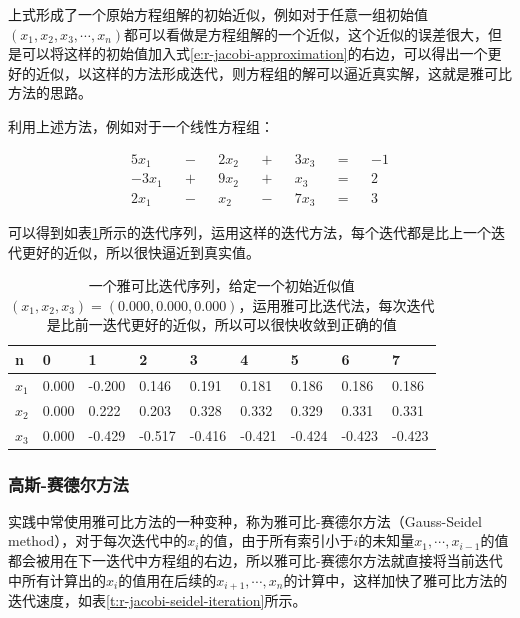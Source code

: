 上式形成了一个原始方程组解的初始近似，例如对于任意一组初始值$(x_1,x_2,x_3,\cdots,x_n)$都可以看做是方程组解的一个近似，这个近似的误差很大，但是可以将这样的初始值加入式\ref{e:r-jacobi-approximation}的右边，可以得出一个更好的近似，以这样的方法形成迭代，则方程组的解可以逼近真实解，这就是雅可比方法的思路。

利用上述方法，例如对于一个线性方程组：

\begin{equation}
\begin{aligned}
	5x_1  && - && 2x_2 && + && 3x_3 && = && -1\\
	-3x_1 && + && 9x_2 && + && x_3  && = && 2\\
	2x_1  && - && x_2  && - && 7x_3 && = && 3
\end{aligned}
\end{equation}

可以得到如表\ref{t:r-jacobi-iteration}所示的迭代序列，运用这样的迭代方法，每个迭代都是比上一个迭代更好的近似，所以很快逼近到真实值。

\begin{table}
\caption{一个雅可比迭代序列，给定一个初始近似值$(x_1,x_2,x_3)=(0.000,0.000,0.000)$，运用雅可比迭代法，每次迭代是比前一迭代更好的近似，所以可以很快收敛到正确的值}
\label{t:r-jacobi-iteration}
\begin{tabular}{p{}|p{}|p{}|p{}|p{}|p{}|p{}|p{}|p{}}
\hline 
   n & 0 & 1 & 2 & 3& 4& 5 &6 & 7 \\
    \hline  
  $x_1$ & 0.000 & -0.200 & 0.146  & 0.191  & 0.181  & 0.186  & 0.186  & 0.186\\
  $x_2$ & 0.000 & 0.222  & 0.203  & 0.328  & 0.332  & 0.329  & 0.331  & 0.331\\
  $x_3$ & 0.000 & -0.429 & -0.517 & -0.416 & -0.421 & -0.424 & -0.423 & -0.423\\
 \hline 
\end{tabular}
\end{table}




\subsubsection{高斯-赛德尔方法}\label{sec:r-gauss-seidel-iteration}
实践中常使用雅可比方法的一种变种\cite{a:ModelingtheInteractionofLightBetweenDiffuseSurfaces}，称为雅可比-赛德尔方法（Gauss-Seidel method），对于每次迭代中的$x_i$的值，由于所有索引小于$i$的未知量$x_1,\cdots,x_{i-1}$的值都会被用在下一迭代中方程组的右边，所以雅可比-赛德尔方法就直接将当前迭代中所有计算出的$x_i$的值用在后续的$x_{i+1},\cdots,x_n$的计算中，这样加快了雅可比方法的迭代速度，如表\ref{t:r-jacobi-seidel-iteration}所示。

